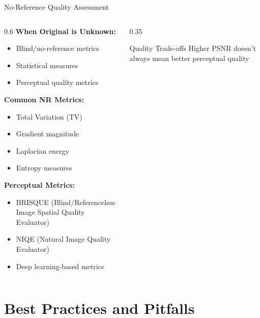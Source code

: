 \documentclass[aspectratio=169,10pt]{beamer}
\begin{document}
\begin{frame}{No-Reference Quality Assessment}
    \begin{columns}[T]
        \begin{column}{0.6\textwidth}
            \textbf{When Original is Unknown:}
            \begin{itemize}
                \item Blind/no-reference metrics
                \item Statistical measures
                \item Perceptual quality metrics
            \end{itemize}

            \textbf{Common NR Metrics:}
            \begin{itemize}
                \item Total Variation (TV)
                \item Gradient magnitude
                \item Laplacian energy
                \item Entropy measures
            \end{itemize}

            \textbf{Perceptual Metrics:}
            \begin{itemize}
                \item BRISQUE (Blind/Referenceless Image Spatial Quality Evaluator)
                \item NIQE (Natural Image Quality Evaluator)
                \item Deep learning-based metrics
            \end{itemize}
        \end{column}
        \begin{column}{0.35\textwidth}
            \begin{insight}{Quality Trade-offs}{}
                Higher PSNR doesn't always mean better perceptual quality
            \end{insight}
        \end{column}
    \end{columns}
\end{frame}

\section{Best Practices and Pitfalls}
\end{document}
